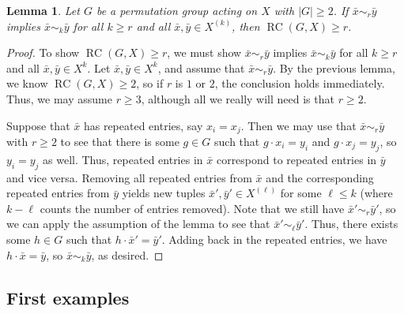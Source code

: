 \documentclass[11pt]{amsart}
\theoremstyle{plain}
\newtheorem*{lemma*}{Lemma}
\theoremstyle{definition}
\theoremstyle{remark}
\DeclareMathOperator{\rc}{RC}
\begin{document}
\begin{lemma*}\label{lem.RCRepeatedEntries}
Let $G$ be a permutation group acting on $X$ with $|G| \ge 2$. If $\bar{x}\sim_r\bar{y}$ implies $\bar{x}\sim_k\bar{y}$  for all $k\ge r$ and all $\bar{x},\bar{y} \in X^{(k)}$, then  $\rc(G,X)\ge r$.
\end{lemma*}
\begin{proof}
To show $\rc(G,X)\ge r$, we must show $\bar{x}\sim_r\bar{y}$ implies $\bar{x}\sim_k\bar{y}$  for all $k\ge r$ and all $\bar{x},\bar{y} \in X^k$. Let $\bar{x},\bar{y} \in X^k$, and assume that $\bar{x}\sim_r\bar{y}$. By the previous lemma, we know $\rc(G,X)\ge 2$, so if $r$ is $1$ or $2$, the conclusion holds immediately. Thus, we may assume $r\ge 3$, although all we really will need is that $r\ge 2$.

Suppose that $\bar{x}$ has repeated entries, say $x_i = x_j$. Then we may use that $\bar{x}\sim_r\bar{y}$ with $r\ge 2$ to see that there is some $g\in G$ such that $g\cdot x_i = y_i$ and $g\cdot x_j = y_j$, so $y_i = y_j$ as well. Thus, repeated entries in $\bar{x}$ correspond to repeated entries in $\bar{y}$ and vice versa. Removing all repeated entries from $\bar{x}$ and the corresponding repeated entries from $\bar{y}$ yields new tuples $\bar{x}',\bar{y}' \in X^{(\ell)}$ for some $\ell\le k$ (where $k-\ell$ counts the number of entries removed). Note that we still have $\bar{x}'\sim_r\bar{y}'$, so we can apply the assumption of the lemma to see that $\bar{x}'\sim_\ell \bar{y}'$. Thus, there exists some $h\in G$ such that $h\cdot \bar{x}' = \bar{y}'$. Adding back in the repeated entries, we have  $h\cdot \bar{x} = \bar{y}$, so $\bar{x}\sim_k\bar{y}$, as desired.
\end{proof}


\subsection{First examples}
\end{document}
